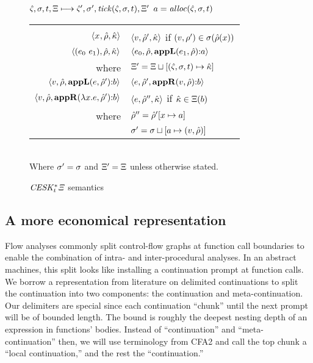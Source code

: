 \begin{figure}
  \centering
  $\hat\varsigma,\sigma,t,\Xi \longmapsto \hat\varsigma',\sigma',\mathit{tick}(\hat\varsigma,\sigma,t),\Xi'$ \quad $a = \mathit{alloc}(\hat\varsigma,\sigma,t)$ \\
  \begin{tabular}{r|l}
    \hline\vspace{-3mm}\\
    $\langle x^{{}}, \hat{\rho}, \hat{\kappa} \rangle$
    &
    $\langle v, \hat{\rho}',\hat{\kappa} \rangle$ if $(v,\rho') \in \sigma(\hat{\rho}(x))$
    \\
    $\langle (e_{0}\ e_{1}){},\hat{\rho},\hat{\kappa} \rangle$
    &
    $\langle e_{0},\hat{\rho},\mathbf{appL}(e_{1},\hat{\rho}){\tt :} a \rangle$ \\
    where & $\Xi' = \Xi\sqcup[(\hat\varsigma,\sigma,t) \mapsto \hat{\kappa}]$
    \\
    $\langle v,\hat{\rho}, \mathbf{appL}(e,\hat{\rho}'){\tt :} b \rangle$
    &
    $\langle e,\hat{\rho}',\mathbf{appR}(v,\hat{\rho}){\tt :} b \rangle$
    \\
    $\langle v,\hat{\rho},\mathbf{appR}(\lambda{} x. e,\hat{\rho}'){\tt :} b \rangle$
    &
    $\langle e,\hat{\rho}'',\hat{\kappa} \rangle$ if $\hat{\kappa} \in \Xi(b)$ \\
    where & $\hat{\rho}'' = \hat{\rho}'[x\mapsto a]$ \\
          & $\sigma' = \sigma\sqcup[a \mapsto (v,\hat{\rho})]$
  \end{tabular} \\
  Where $\sigma' = \sigma$ and $\Xi' = \Xi$ unless otherwise stated.
  \caption{$\mathit{CESK^*_t\Xi}$ semantics}
  \label{fig:ceskkstart-semantics}
\end{figure}

\subsection{A more economical representation}

Flow analyses commonly split control-flow graphs at function call boundaries to enable the combination of intra- and inter-procedural analyses.
%
In an abstract machines, this split looks like installing a continuation prompt at function calls.
%
We borrow a representation from literature on delimited continuations to split the continuation into two components: the continuation and meta-continuation.
%
Our delimiters are special since each continuation ``chunk'' until the next prompt will be of bounded length.
%
The bound is roughly the deepest nesting depth of an expression in functions' bodies.
%
Instead of ``continuation'' and ``meta-continuation'' then, we will use terminology from CFA2 and call the top chunk a ``local continuation,'' and the rest the ``continuation.''
%
%

